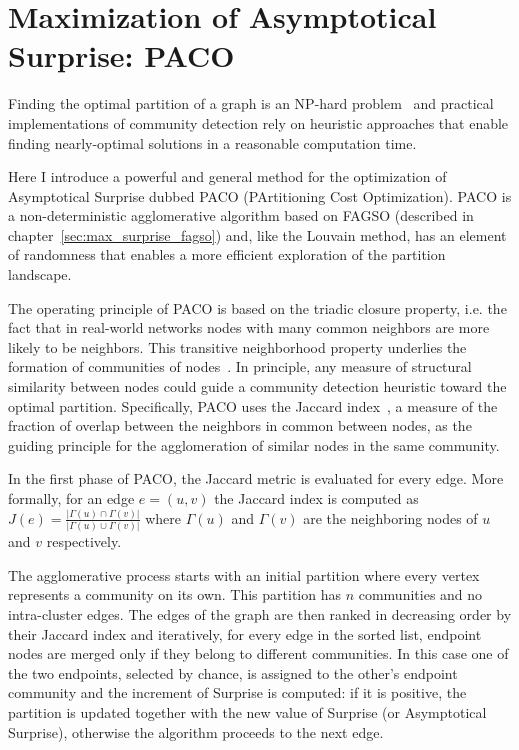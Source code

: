 \section{Maximization of Asymptotical Surprise: PACO}
Finding the optimal partition of a graph is an NP-hard problem~\cite{fortunato2010} and practical implementations of community detection rely on heuristic approaches that enable finding nearly-optimal solutions in a reasonable computation time.

Here I introduce a powerful and general method for the optimization of Asymptotical Surprise dubbed PACO (PArtitioning Cost Optimization).
PACO is a non-deterministic agglomerative algorithm based on FAGSO (described in chapter~\ref{sec:max_surprise_fagso}) and, like the Louvain method, has an element of randomness that enables a more efficient exploration of the partition landscape.

The operating principle of PACO is based on the triadic closure property, i.e.
the fact that in real-world networks nodes with many common neighbors are more likely to be neighbors.
This transitive neighborhood property underlies the formation of communities of nodes~\cite{bianconi2014,eustace2015}.
In principle, any measure of structural similarity between nodes could guide a community detection heuristic toward the optimal partition.
Specifically, PACO uses the Jaccard index~\cite{jaccard1901}, a measure of the fraction of overlap between the neighbors in common between nodes, as the guiding principle for the agglomeration of similar nodes in the same community.

In the first phase of PACO, the Jaccard metric is evaluated for every edge.
More formally, for an edge $e=(u,v)$ the Jaccard index is computed as $J(e)=\frac{|\Gamma(u) \cap \Gamma(v)|}{|\Gamma(u) \cup \Gamma(v)|}$ where $\Gamma(u)$ and $\Gamma(v)$ are the neighboring nodes of $u$ and $v$ respectively.

The agglomerative process starts with an initial partition where every vertex represents a community on its own.
This partition has $n$ communities and no intra-cluster edges.
The edges of the graph are then ranked in decreasing order by their Jaccard index and iteratively, for every edge in the sorted list, endpoint nodes are merged only if they belong to different communities.
In this case one of the two endpoints, selected by chance, is assigned to the other's endpoint community and the increment of Surprise is computed: if it is positive, the partition is updated together with the new value of Surprise (or Asymptotical Surprise), otherwise the algorithm proceeds to the next edge.


